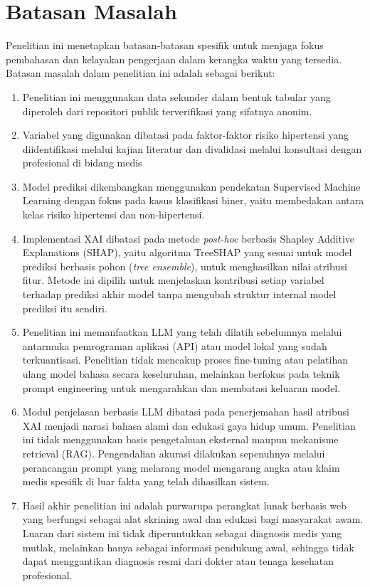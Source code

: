 \section{Batasan Masalah}
Penelitian ini menetapkan batasan-batasan spesifik untuk menjaga fokus pembahasan dan kelayakan pengerjaan dalam kerangka waktu yang tersedia. Batasan masalah dalam penelitian ini adalah sebagai berikut:
\begin{enumerate}
\item Penelitian ini menggunakan data sekunder dalam bentuk tabular yang diperoleh dari repositori publik terverifikasi yang sifatnya anonim. 
\item Variabel yang digunakan dibatasi pada faktor-faktor risiko hipertensi yang diidentifikasi melalui kajian literatur dan divalidasi melalui konsultasi dengan profesional di bidang medis
\item Model prediksi dikembangkan menggunakan pendekatan Supervised Machine Learning dengan fokus pada kasus klasifikasi biner, yaitu membedakan antara kelas risiko hipertensi dan non-hipertensi.
\item Implementasi XAI dibatasi pada metode \textit{post-hoc} berbasis Shapley Additive Explanations (SHAP), yaitu algoritma TreeSHAP yang sesuai untuk model prediksi berbasis pohon (\textit{tree ensemble}), untuk menghasilkan nilai atribusi fitur. Metode ini dipilih untuk menjelaskan kontribusi setiap variabel terhadap prediksi akhir model tanpa mengubah struktur internal model prediksi itu sendiri.
\item Penelitian ini memanfaatkan LLM yang telah dilatih sebelumnya melalui antarmuka pemrograman aplikasi (API) atau model lokal yang sudah terkuantisasi. Penelitian tidak mencakup proses fine-tuning atau pelatihan ulang model bahasa secara keseluruhan, melainkan berfokus pada teknik prompt engineering untuk mengarahkan dan membatasi keluaran model.
\item Modul penjelasan berbasis LLM dibatasi pada penerjemahan hasil atribusi XAI menjadi narasi bahasa alami dan edukasi gaya hidup umum. Penelitian ini tidak menggunakan basis pengetahuan eksternal maupun mekanisme retrieval (RAG). Pengendalian akurasi dilakukan sepenuhnya melalui perancangan prompt yang melarang model mengarang angka atau klaim medis spesifik di luar fakta yang telah dihasilkan sistem.
\item Hasil akhir penelitian ini adalah purwarupa perangkat lunak berbasis web yang berfungsi sebagai alat skrining awal dan edukasi bagi masyarakat awam. Luaran dari sistem ini tidak diperuntukkan sebagai diagnosis medis yang mutlak, melainkan hanya sebagai informasi pendukung awal, sehingga tidak dapat menggantikan diagnosis resmi dari dokter atau tenaga kesehatan profesional.

\end{enumerate}
